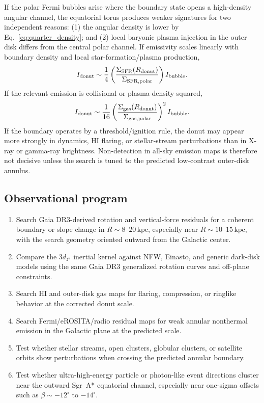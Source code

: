 \documentclass[11pt,a4paper]{article}
\newcommand{\kpc}{\mathrm{kpc}}
\begin{document}
If the polar Fermi bubbles arise where the boundary state opens a high-density
angular channel, the equatorial torus produces weaker signatures for two
independent reasons: (1) the angular density is lower by
Eq.~\eqref{eq:quarter_density}; and (2) local baryonic plasma injection in the
outer disk differs from the central polar channel. If emissivity scales
linearly with boundary density and local star-formation/plasma production,
\begin{equation}
  I_{\rm donut}
  \sim\frac14
  \left(\frac{\Sigma_{\rm SFR}(R_{\rm donut})}{\Sigma_{\rm SFR,polar}}\right)
  I_{\rm bubble}.
  \label{eq:emission_linear}
\end{equation}
If the relevant emission is collisional or plasma-density squared,
\begin{equation}
  I_{\rm donut}
  \sim\frac{1}{16}
  \left(\frac{\Sigma_{\rm gas}(R_{\rm donut})}{\Sigma_{\rm gas,polar}}\right)^2
  I_{\rm bubble}.
  \label{eq:emission_quadratic}
\end{equation}
If the boundary operates by a threshold/ignition rule, the donut may appear
more strongly in dynamics, HI flaring, or stellar-stream perturbations than in
X-ray or gamma-ray brightness. Non-detection in all-sky emission maps is
therefore not decisive unless the search is tuned to the predicted low-contrast
outer-disk annulus.

\subsection{Observational program}

\begin{enumerate}[label=\textbf{O\arabic*.}]
  \item Search Gaia DR3-derived rotation and vertical-force residuals for a
        coherent boundary or slope change in $R\sim8$--$20\,\kpc$, especially
        near $R\sim10$--$15\,\kpc$, with the search geometry oriented outward
        from the Galactic center.
  \item Compare the $3d_{z^2}$ inertial kernel against NFW, Einasto, and
        generic dark-disk models using the same Gaia DR3 generalized rotation
        curves and off-plane constraints.
  \item Search HI and outer-disk gas maps for flaring, compression, or ringlike
        behavior at the corrected donut scale.
  \item Search Fermi/eROSITA/radio residual maps for weak annular nonthermal
        emission in the Galactic plane at the predicted scale.
  \item Test whether stellar streams, open clusters, globular clusters, or
        satellite orbits show perturbations when crossing the predicted
        annular boundary.
  \item Test whether ultra-high-energy particle or photon-like event directions
        cluster near the outward Sgr~A* equatorial channel, especially near
        one-sigma offsets such as $\beta\sim-12^\circ$ to $-14^\circ$.
\end{enumerate}
\end{document}
